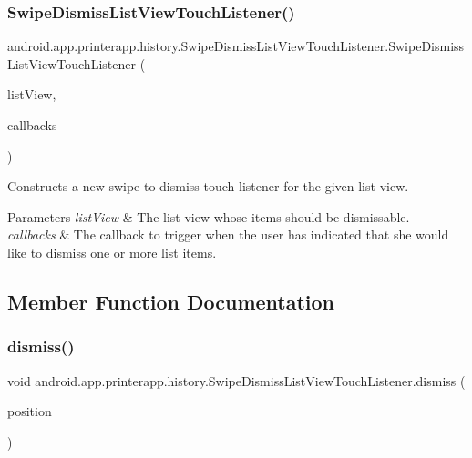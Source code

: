 \subsubsection{\texorpdfstring{Swipe\+Dismiss\+List\+View\+Touch\+Listener()}{SwipeDismissListViewTouchListener()}}
{\footnotesize\ttfamily android.\+app.\+printerapp.\+history.\+Swipe\+Dismiss\+List\+View\+Touch\+Listener.\+Swipe\+Dismiss\+List\+View\+Touch\+Listener (\begin{DoxyParamCaption}\item[{List\+View}]{list\+View,  }\item[{\hyperlink{interfaceandroid_1_1app_1_1printerapp_1_1history_1_1_swipe_dismiss_list_view_touch_listener_1_1_dismiss_callbacks}{Dismiss\+Callbacks}}]{callbacks }\end{DoxyParamCaption})}

Constructs a new swipe-\/to-\/dismiss touch listener for the given list view.


\begin{DoxyParams}{Parameters}
{\em list\+View} & The list view whose items should be dismissable. \\
\hline
{\em callbacks} & The callback to trigger when the user has indicated that she would like to dismiss one or more list items. \\
\hline
\end{DoxyParams}


\subsection{Member Function Documentation}
\mbox{\label{classandroid_1_1app_1_1printerapp_1_1history_1_1_swipe_dismiss_list_view_touch_listener_aa65381086b90f5b0b1117956ebc57daf}} 
\subsubsection{\texorpdfstring{dismiss()}{dismiss()}}
{\footnotesize\ttfamily void android.\+app.\+printerapp.\+history.\+Swipe\+Dismiss\+List\+View\+Touch\+Listener.\+dismiss (\begin{DoxyParamCaption}\item[{int}]{position }\end{DoxyParamCaption})}

